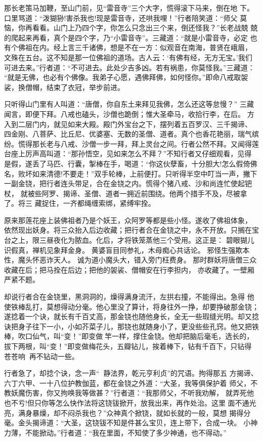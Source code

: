 那长老策马加鞭，至山门前，见“雷音寺”三个大字，慌得滚下马来，倒在地
下。口里骂道：“泼猢狲!害杀我也!现是雷音寺，还哄我哩！”行者陪笑道：“师父
莫恼，你再看看。山门上乃四个字，你怎么只念出三个来，倒还怪我？”长老战兢
兢的爬起来再看，真个是四个字，乃“小雷音寺”。三藏道：“就是小雷音寺，必定
也有个佛祖在内。经上言三千诸佛，想是不在一方：似观音在南海，普贤在峨眉，
文殊在五台。这不知是那一位佛祖的道场。古人云：‘有佛有经，无方无宝。’我们
可进去来。”行者道：“不可进去。此处少吉多凶。若有祸患，你莫怪我。”三藏道：
“就是无佛，也必有个佛像。我弟子心愿，遇佛拜佛，如何怪你。”即命八戒取袈
裟，换僧帽，结束了衣冠，举步前进。

只听得山门里有人叫道：“唐僧，你自东土来拜见我佛，怎么还这等怠慢？”
三藏闻言，即便下拜。八戒也磕头，沙僧也跪倒；惟大圣牵马，收拾行李，在后。
方入到二层门内，就见如来大殿。殿门外宝台之下，摆列着五百罗汉、三千揭谛、
四金刚、八菩萨、比丘尼、优婆塞、无数的圣僧、道者。真个也香花艳丽，瑞气缤
纷。慌得那长老与八戒、沙僧一步一拜，拜上灵台之间。行者公然不拜。又闻得莲
台座上厉声高叫道：“那孙悟空，见如来怎么不拜？”不知行者又仔细观看，见得
是假，遂丢了马匹、行囊，掣棒在手，喝道：“你这伙孽畜，十分胆大!怎么假倚佛
名，败坏如来清德!不要走！”双手轮棒，上前便打。只听得半空中叮当一声，撇下
一副金铙，把行者连头带足，合在金铙之内。慌得个猪八戒、沙和尚连忙使起钯杖，
就被些阿罗、揭谛、圣僧、道者一拥近前围绕。他两个措手不及，尽被拿了。将三
藏捉住，一齐都绳缠索绑，紧缚牢拴。

原来那莲花座上装佛祖者乃是个妖王，众阿罗等都是些小怪。遂收了佛祖体象，
依然现出妖身。将三众抬入后边收藏；把行者合在金铙之中，永不开放。只搁在宝
台之上，限三昼夜化为脓血。化后，才将铁笼蒸他三个受用。这正是：
碧眼猢儿识假真，禅机见象拜金身。
黄婆盲目同参礼，木母痴心共话论。
邪怪生强欺本性，魔头怀恶诈天人。
诚为道小魔头大，错入旁门枉费身。
那时群妖将唐僧三众收藏在后；把马拴在后边；把他的袈裟、僧帽安在行李担内，
亦收藏了。一壁厢严紧不题。

却说行者合在金铙里，黑洞洞的，燥得满身流汗，左拱右撞，不能得出。急得
他使铁棒乱打，莫想得动分毫。他心里没了算计，将身往外一挣，却要挣破那金铙；
遂捻着一个诀，就长有千百丈高，那金铙也随他身长，全无一些瑕缝光明。却又捻
诀把身子往下一小，小如芥菜子儿，那铙也就随身小了，更没些些孔窍。他又把铁
棒，吹口仙气，叫“变！”即变做竿一样，撑住金铙。他却把脑后毫毛，选长的，
拔下两根，叫“变！”即变做梅花头，五瓣钻儿，挨着棒下，钻有千百下，只钻得
苍苍响，再不钻动一些。

行者急了，却捻个诀，念一声“静法界，乾元亨利贞”的咒语。拘得那五
方揭谛、六丁六甲、一十八位护教伽蓝，都在金铙之外道：“大圣，我等俱保护着
师父，不教妖魔伤害，你又拘唤我等做甚？”行者道：“我那师父，不听我劝解，
就弄死他也不亏!但只你等怎么快作法将这铙钹掀开，放我出来，再作处治。这里
面不通光亮，满身暴燥，却不闷杀我也？”众神真个掀铙，就如长就的一般，莫想
揭得分毫。金头揭谛道：“大圣，这铙钹不知是件甚么宝贝，连上带下，合成一块。
小神力薄，不能掀动。”行者道：“我在里面，不知使了多少神通，也不得动。”

